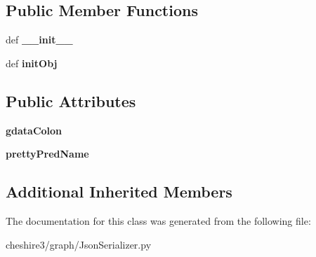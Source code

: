 \subsection*{Public Member Functions}
\begin{DoxyCompactItemize}
\item 
\hypertarget{classcheshire3_1_1graph_1_1_json_serializer_1_1_pretty_json_serializer_abfe7213e81d36089a5b5512caecf3b20}{def {\bfseries \-\_\-\-\_\-init\-\_\-\-\_\-}}\label{classcheshire3_1_1graph_1_1_json_serializer_1_1_pretty_json_serializer_abfe7213e81d36089a5b5512caecf3b20}

\item 
\hypertarget{classcheshire3_1_1graph_1_1_json_serializer_1_1_pretty_json_serializer_af6545046ee01142c0223a6b68f4f50da}{def {\bfseries init\-Obj}}\label{classcheshire3_1_1graph_1_1_json_serializer_1_1_pretty_json_serializer_af6545046ee01142c0223a6b68f4f50da}

\end{DoxyCompactItemize}
\subsection*{Public Attributes}
\begin{DoxyCompactItemize}
\item 
\hypertarget{classcheshire3_1_1graph_1_1_json_serializer_1_1_pretty_json_serializer_a25f590b9fa77f50adb237f8ae63bce61}{{\bfseries gdata\-Colon}}\label{classcheshire3_1_1graph_1_1_json_serializer_1_1_pretty_json_serializer_a25f590b9fa77f50adb237f8ae63bce61}

\item 
\hypertarget{classcheshire3_1_1graph_1_1_json_serializer_1_1_pretty_json_serializer_ad5cfdfaf33b9c78dc98d440e41d0945f}{{\bfseries pretty\-Pred\-Name}}\label{classcheshire3_1_1graph_1_1_json_serializer_1_1_pretty_json_serializer_ad5cfdfaf33b9c78dc98d440e41d0945f}

\end{DoxyCompactItemize}
\subsection*{Additional Inherited Members}


The documentation for this class was generated from the following file\-:\begin{DoxyCompactItemize}
\item 
cheshire3/graph/Json\-Serializer.\-py\end{DoxyCompactItemize}
